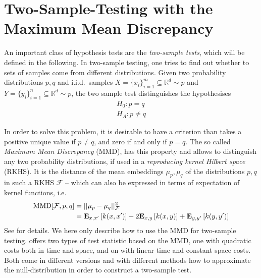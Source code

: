 %

\section{Two-Sample-Testing with the Maximum Mean Discrepancy}
\label{sec:mmd_into}
An important class of hypothesis tests are the \emph{two-sample tests}, which will be defined in the following.
In two-sample testing, one tries to find out whether to sets of samples come from different distributions. Given two probability distributions $p,q$ and i.i.d.\ samples $X=\{x_i\}_{i=1}^m\subseteq \mathbb{R}^d\sim p$ and $Y=\{y_i\}_{i=1}^n\subseteq \mathbb{R}^d\sim p$, the two sample test distinguishes the hypothesises
\begin{align*}
H_0: p=q\\
H_A: p\neq q
\end{align*}

In order to solve this problem, it is desirable to have a criterion than takes a positive unique value if $p\neq q$, and zero if and only if $p=q$. The so called \emph{Maximum Mean Discrepancy} (MMD), has this property and allows to distinguish any two probability distributions, if used in a \emph{reproducing kernel Hilbert space} (RKHS). It is the distance of the mean embeddings $\mu_p, \mu_q$ of the distributions $p,q$ in such a RKHS $\mathcal{F}$ -- which can also be expressed in terms of expectation of kernel functions, i.e.
\begin{align}
\label{eqn:mmd_population}
\operatorname{MMD}[\mathcal{F},p,q]&=||\mu_p-\mu_q||_\mathcal{F}^2\\
&=\textbf{E}_{x,x'}\left[ k(x,x')\right]-
  2\textbf{E}_{x,y}\left[ k(x,y)\right]
  +\textbf{E}_{y,y'}\left[ k(y,y')\right]\notag
\end{align}
See \citep[Section 2]{Gretton2012} for details. We here only describe how to
use the MMD for two-sample testing. \shogun{} offers two types of test statistic based on the MMD, one with quadratic costs both in time and space, and on with linear time and constant space costs. Both come in different versions and with different methods how to approximate the null-distribution in order to construct a two-sample test.

